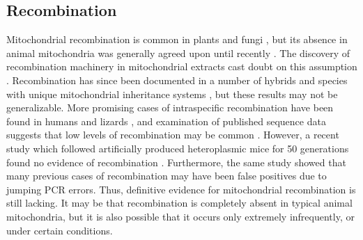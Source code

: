 \documentclass[12pt,twoside]{reedthesis}
\begin{document}


\subsection{Recombination}
Mitochondrial recombination is common in plants and fungi \citep{barr_inheritance_2005}, but its absence in animal mitochondria was generally agreed upon until recently \citep{wolstenholme_animal_1992}.
The discovery of recombination machinery in mitochondrial extracts cast doubt on this assumption \citep{thyagarajan_mammalian_1996}.
Recombination has since been documented in a number of hybrids and species with unique mitochondrial inheritance systems \citep{zouros_direct_1992, gantenbein_evidence_2005, guo_evidence_2006, ciborowski_rare_2007}, but these results may not be generalizable.
More promising cases of intraspecific recombination have been found in humans and lizards \citep{kraytsberg_recombination_2004, Ujvari_mitochondrial_2007}, and examination of published sequence data suggests that low levels of recombination may be common \citep{ladoukakis_recombination_2001, piganeau_broad_2004, tsaousis_widespread_2005}.
However, a recent study which followed artificially produced heteroplasmic mice for 50 generations found no evidence of recombination \citep{hagstrom_no_2014}.
Furthermore, the same study showed that many previous cases of recombination may have been false positives due to jumping PCR errors.
Thus, definitive evidence for mitochondrial recombination is still lacking.
It may be that recombination is completely absent in typical animal mitochondria, but it is also possible that it occurs only extremely infrequently, or under certain conditions.
\end{document}
